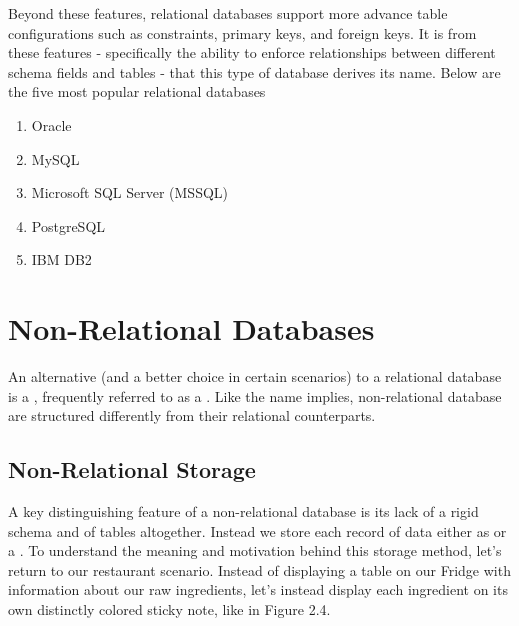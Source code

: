 Beyond these features, relational databases support more advance table configurations such as constraints, primary keys, and foreign keys. It is from these features - specifically the ability to enforce relationships between different schema fields and tables - that this type of database derives its name. Below are the five most popular relational databases

\begin{enumerate}
    \item Oracle
    \item MySQL
    \item Microsoft SQL Server (MSSQL)
    \item PostgreSQL
    \item IBM DB2
\end{enumerate}

\section{Non-Relational Databases}

An alternative (and a better choice in certain scenarios) to a relational database is a , frequently referred to as a . Like the name implies, non-relational database are structured differently from their relational counterparts. 

\subsection*{Non-Relational Storage}

A key distinguishing feature of a non-relational database is its lack of a rigid schema and of tables altogether. Instead we store each record of data either as  or a . To understand the meaning and motivation behind this storage method, let's return to our restaurant scenario. Instead of displaying a table on our Fridge with information about our raw ingredients, let's instead display each ingredient on its own distinctly colored sticky note, like in Figure 2.4.


